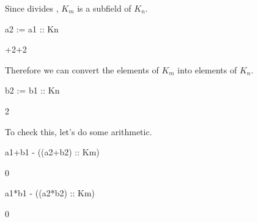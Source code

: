 {{{{{{{{{{{{{{{{{{\begin{xtc}
\begin{xtccomment}
Since  divides ,
$K_m$ is a subfield of $K_n$.
\end{xtccomment}
\begin{spadsrc}
a2 := a1 :: Kn 
\end{spadsrc}
\begin{TeXOutput}
\begin{fricasmath}{7}
+2\TIMES {}+2\TIMES {}%
\end{fricasmath}
\end{TeXOutput}
\end{xtc}
\begin{xtc}
\begin{xtccomment}
Therefore we can convert the elements of $K_m$
into elements of $K_n$.
\end{xtccomment}
\begin{spadsrc}
b2 := b1 :: Kn 
\end{spadsrc}
\begin{TeXOutput}
\begin{fricasmath}{8}
2\TIMES {}%
\end{fricasmath}
\end{TeXOutput}
\end{xtc}
%
%
\begin{xtc}
\begin{xtccomment}
To check this, let's do some arithmetic.
\end{xtccomment}
\begin{spadsrc}
a1+b1 - ((a2+b2) :: Km) 
\end{spadsrc}
\begin{TeXOutput}
\begin{fricasmath}{9}
0%
\end{fricasmath}
\end{TeXOutput}
\end{xtc}
\begin{xtc}
\begin{xtccomment}
\end{xtccomment}
\begin{spadsrc}
a1*b1 - ((a2*b2) :: Km) 
\end{spadsrc}
\begin{TeXOutput}
\begin{fricasmath}{10}
0%

\end{fricasmath}
\end{TeXOutput}
\end{xtc}}}}}}}}}}}}}}}}}}}
